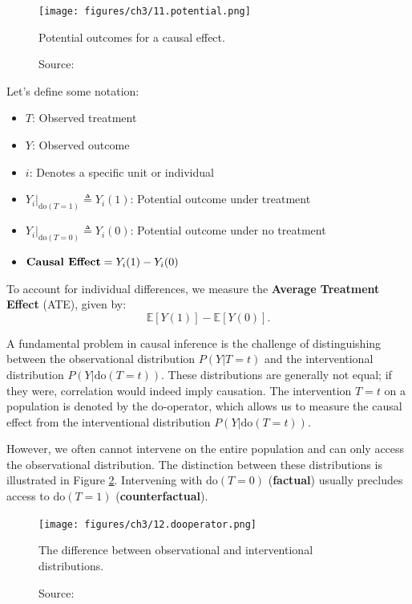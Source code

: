 \begin{figure}[h]
    \centering
    \texttt{[image: figures/ch3/11.potential.png]}
    \caption{Potential outcomes for a causal effect.}
    \vspace{-10px}
    \caption*{\scriptsize{Source: \cite{Neal_2020a}}}
    \label{fig:potential_outcomes}
\end{figure}

Let's define some notation:
\begin{itemize}
    \item \( T \): Observed treatment
    \item \( Y \): Observed outcome
    \item \( i \): Denotes a specific unit or individual
    \item \( Y_i|_{\text{do}(T=1)} \triangleq Y_i(1) \): Potential outcome under treatment
    \item \( Y_i|_{\text{do}(T=0)} \triangleq Y_i(0) \): Potential outcome under no treatment
    \item \( \text{\textbf{Causal Effect}} = Y_i(1) - Y_i(0) \)
\end{itemize}


To account for individual differences, we measure the
\textbf{Average Treatment Effect} (ATE), given by:
\begin{equation}
\mathbb{E}[Y(1)] - \mathbb{E}[Y(0)].
\end{equation}

A fundamental problem in causal inference is the challenge
of distinguishing between the observational distribution
\( P(Y|T=t) \) and the interventional distribution \( P(Y|\text{do}(T=t)) \).
These distributions are generally not equal; if they were, correlation
would indeed imply causation. The intervention \( T=t \) on a population
is denoted by the do-operator, which allows us to measure the causal
effect from the interventional distribution \( P(Y|\text{do}(T=t)) \).

However, we often cannot intervene on the entire population
and can only access the observational distribution.
The distinction between these distributions is illustrated
in Figure \ref{fig:dooperator}.
Intervening with \( \text{do}(T=0) \) (\textbf{factual}) usually
precludes access to \( \text{do}(T=1) \) (\textbf{counterfactual}).

\begin{figure}[h]
    \centering
    \texttt{[image: figures/ch3/12.dooperator.png]}
    \caption{The difference between observational and interventional distributions.}
    \vspace{-10px}
    \caption*{\scriptsize{Source: \cite{Neal_2020a}}}
    \label{fig:dooperator}
\end{figure}

